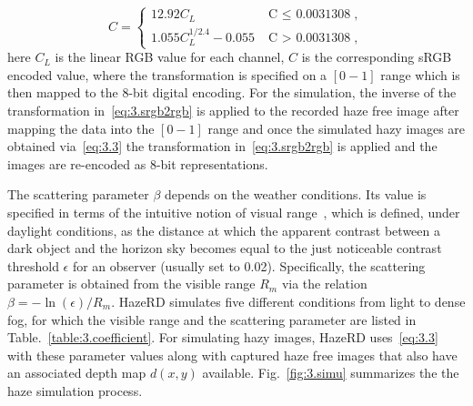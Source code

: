 \begin{equation}
C = \begin{cases}
12.92C_{L} &\text{C $\le$ 0.0031308},\\
1.055C_{L}^{1/2.4}-0.055 &\text{C $>$ 0.0031308},
\end{cases}
\label{eq:3.srgb2rgb}
\end{equation}
here $C_{L}$ is the linear RGB value for each channel, $C$ is the corresponding sRGB encoded value, where the transformation is specified on a $[0-1]$ range which is then mapped to the 8-bit digital encoding. For the simulation, the inverse of the transformation in~\eqref{eq:3.srgb2rgb} is applied to the recorded haze free image after mapping the data into the  $[0-1]$ range and once the simulated hazy images are obtained via~\eqref{eq:3.3} the transformation in~\eqref{eq:3.srgb2rgb} is applied and the images are re-encoded as 8-bit representations.

The scattering parameter $\beta$ depends on the weather conditions. Its value is specified in terms of the intuitive notion of visual range~\cite[pp. 42]{McCartney76}, which is defined, under daylight conditions, as the distance at which the apparent contrast between a dark object and the horizon sky becomes equal to the just noticeable contrast threshold $\epsilon$ for an observer (usually set to 0.02). Specifically, the scattering parameter is obtained from the visible range $R_{m}$ via the relation $\beta = -\ln(\epsilon)/R_m $. HazeRD simulates five different conditions from light to dense fog, for which the visible range and the scattering parameter are listed in Table.~\ref{table:3.coefficient}. For simulating hazy images, HazeRD uses~\eqref{eq:3.3} with these parameter values along with captured haze free images that also have an associated depth map $d(x,y)$ available. Fig.~\ref{fig:3.simu} summarizes the the haze simulation process.

